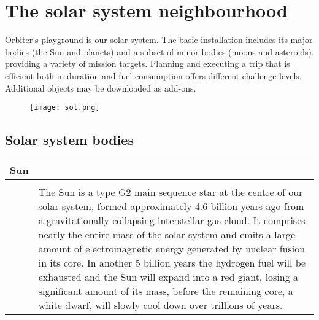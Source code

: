 \documentclass[Orbiter User Manual.tex]{subfiles}
\begin{document}
\section{The solar system neighbourhood}
Orbiter’s playground is our solar system. The basic installation includes its major bodies (the Sun and planets) and a subset of minor bodies (moons and asteroids), providing a variety of mission targets. Planning and executing a trip that is efficient both in duration and fuel consumption offers different challenge levels. Additional objects may be downloaded as add-ons.

\begin{figure}[H]
	\centering
	\texttt{[image: sol.png]}
\end{figure}


\subsection{Solar system bodies}

\begin{table}[H]
	\begin{tabularx}{\textwidth}{ |lX| }
	\hline\rule{0pt}{2ex}
	\textbf{Sun} &\\
	\hline\rule{0pt}{2ex}
	\adjustbox{valign=t}{
		\begin{tabular}{ c }
		\texttt{[image: solsys\_sun.jpg]}\\
		\end{tabular}
		}
	& \vfill
	The Sun is a type G2 main sequence star at the centre of our solar system, formed approximately 4.6 billion years ago from a gravitationally collapsing interstellar gas cloud. It comprises nearly the entire mass of the solar system and emits a large amount of electromagnetic energy generated by nuclear fusion in its core. In another 5 billion years the hydrogen fuel will be exhausted and the Sun will expand into a red giant, losing a significant amount of its mass, before the remaining core, a white dwarf, will slowly cool down over trillions of years.\\
	\hline
	\end{tabularx}
\end{table}
\end{document}
